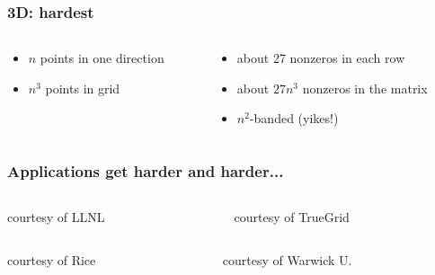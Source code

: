 \documentclass[10pt]{beamer}
\begin{document}
\begin{frame}
\frametitle{3D: hardest}
\begin{columns}
  \begin{column}{0.48\textwidth}
  \end{column}
  \begin{column}{0.48\textwidth}
  \end{column}
\end{columns}
\begin{columns}
  \begin{column}{0.48\textwidth}
  \vspace{-0.5cm}
  \begin{itemize}
  \item $n$ points in one direction
  \item $n^3$ points in grid
  \end{itemize}
  \end{column}
  \begin{column}{0.48\textwidth}
  \vspace{-0.5cm}
  \begin{itemize}
  \item about 27 nonzeros in each row
  \item about $27n^3$ nonzeros in the matrix
  \item $n^2$-banded (yikes!)
  \end{itemize}
  \end{column}
\end{columns}
\end{frame}
\begin{frame}
\frametitle{Applications get harder and harder...}
\begin{columns}
  \begin{column}{0.48\textwidth}

  {courtesy of LLNL}
  \end{column}
  \begin{column}{0.48\textwidth}

  {courtesy of TrueGrid}
  \end{column}
\end{columns}
\begin{columns}
  \begin{column}{0.48\textwidth}

  {courtesy of Rice}
  \end{column}
  \begin{column}{0.48\textwidth}
  
 {courtesy of Warwick U.}
  \end{column}
\end{columns}
\end{frame}
\end{document}
